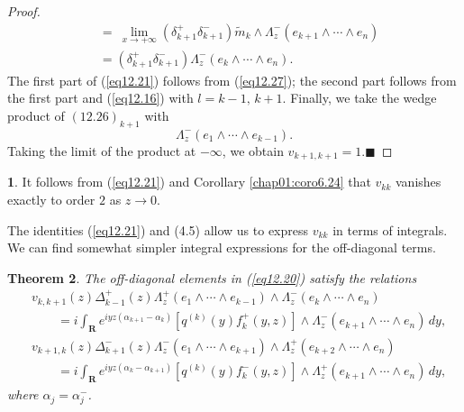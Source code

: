 \documentclass{surv-l}
\theoremstyle{plain}
\newtheorem{theorem}{Theorem}[section]
\theoremstyle{definition}
\newtheorem{remark}[theorem]{\sc{Remark}}
\numberwithin{equation}{chapter}
\begin{document}
\begin{proof}
\begin{align}
&=\ \lim_{x\rightarrow+\infty}(\delta_{k+1}^{+}\delta_{k+1}^{-})\tilde{m}_{k}\wedge\Lambda_{z}^{-}(e_{k+1}\wedge\cdots\wedge e_{n})\\\nonumber
&=(\delta_{k+1}^{+}\delta_{k+1}^{-})\Lambda_{z}^{-}(e_{k}\wedge\cdots\wedge e_{n}).\nonumber
\end{align}
The first part of (\ref{eq12.21}) follows from (\ref{eq12.27}); the second part follows from the first part and (\ref{eq12.16}) with $l=k-1,\, k+1$. Finally, we take the wedge product of $(12.26)_{k+1}$ with
\begin{equation*}
\Lambda_{z}^{-}(e_{1}\wedge\cdots \wedge e_{k-1}).
\end{equation*}
Taking the limit of the product at $-\infty$, we obtain $v_{k+1,k+1}=1. \blacksquare$
\setcounter{theorem}{27}
\end{proof}
\begin{remark}\label{rem12.28}
It follows from (\ref{eq12.21}) and Corollary \ref{chap01:coro6.24} that $v_{kk}$ vanishes exactly to order $2$ as $z\rightarrow 0$.

The identities (\ref{eq12.21}) and (4.5) allow us to express $v_{kk}$ in terms of integrals. We can find somewhat simpler integral expressions for the off-diagonal terms.
\end{remark}
\begin{theorem}\label{thm12.29}
The off-diagonal elements in \emph{(\ref{eq12.20})} satisfy the relations
\setcounter{equation}{29}
\begin{align}\label{eq12.30}
& v_{k,k+1}(z)\Delta_{k-1}^{+}(z)\Lambda_{z}^{+}(e_{1}\wedge\cdots\wedge e_{k-1})\wedge\Lambda_{z}^{-}(e_{k}\wedge\cdots\wedge e_{n})\\
&\quad\quad =i\int_{\mathbf{R}}e^{iyz(\alpha_{k+1}-\alpha_{k})}[q^{(k)}(y)f_{k}^{+}(y, z)]\wedge\Lambda_{z}^{-}(e_{k+1}\wedge\cdots\wedge e_{n})\,dy,\nonumber\\
& v_{k+1, k}(z)\Delta_{k+1}^{-}(z)\Lambda_{z}^{-}(e_{1}\wedge\cdots\wedge e_{k+1})\wedge\Lambda_{z}^{+}(e_{k+2}\wedge\cdots \wedge e_{n})\label{eq12.31}\\
&\quad\quad=i\int_{\mathbf{R}}e^{iyz(\alpha_{k}-\alpha_{k+1})}[q^{(k)}(y)f_{k}^{-}(y, z)]\wedge\Lambda_{z}^{+}(e_{k+1}\wedge\cdots\wedge e_{n})\,dy,\nonumber
\end{align}
where $\alpha_{j}=\alpha_{j}^{-}$.
\end{theorem}
\end{document}

